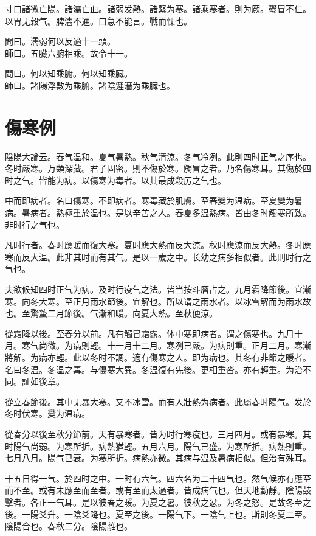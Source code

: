 寸口諸微亡陽。諸濡亡血。諸弱发熱。諸緊为寒。諸乘寒者。則为厥。鬱冒不仁。以胃无穀气。脾濇不通。口急不能言。戰而慄也。

問曰。濡弱何以反適十一頭。\\
師曰。五臓六腑相乘。故令十一。

問曰。何以知乘腑。何以知乘臓。\\
師曰。諸陽浮數为乘腑。諸陰遲濇为乘臓也。

\chapter{傷寒例}

陰陽大論云。春气温和。夏气暑熱。秋气清涼。冬气冷冽。此則四时正气之序也。冬时嚴寒。万類深藏。君子固密。則不傷於寒。觸冒之者。乃名傷寒耳。其傷於四时之气。皆能为病。以傷寒为毒者。以其最成殺厉之气也。

中而即病者。名曰傷寒。不即病者。寒毒藏於肌膚。至春變为温病。至夏變为暑病。暑病者。熱極重於温也。是以辛苦之人。春夏多温熱病。皆由冬时觸寒所致。非时行之气也。

凡时行者。春时應暖而復大寒。夏时應大熱而反大涼。秋时應涼而反大熱。冬时應寒而反大温。此非其时而有其气。是以一歲之中。长幼之病多相似者。此則时行之气也。

夫欲候知四时正气为病。及时行疫气之法。皆当按斗曆占之。九月霜降節後。宜漸寒。向冬大寒。至正月雨水節後。宜解也。所以谓之雨水者。以冰雪解而为雨水故也。至驚蟄二月節後。气漸和暖。向夏大熱。至秋便涼。

從霜降以後。至春分以前。凡有觸冒霜露。体中寒即病者。谓之傷寒也。九月十月。寒气尚微。为病則輕。十一月十二月。寒冽已嚴。为病則重。正月二月。寒漸將解。为病亦輕。此以冬时不調。適有傷寒之人。即为病也。其冬有非節之暖者。名曰冬温。冬温之毒。与傷寒大異。冬温復有先後。更相重沓。亦有輕重。为治不同。証如後章。

從立春節後。其中无暴大寒。又不冰雪。而有人壯熱为病者。此屬春时陽气。发於冬时伏寒。變为温病。

從春分以後至秋分節前。天有暴寒者。皆为时行寒疫也。三月四月。或有暴寒。其时陽气尚弱。为寒所折。病熱猶輕。五月六月。陽气已盛。为寒所折。病熱則重。七月八月。陽气已衰。为寒所折。病熱亦微。其病与温及暑病相似。但治有殊耳。

十五日得一气。於四时之中。一时有六气。四六名为二十四气也。然气候亦有應至而不至。或有未應至而至者。或有至而太過者。皆成病气也。但天地動靜。陰陽鼓擊者。各正一气耳。是以彼春之暖。为夏之暑。彼秋之忿。为冬之怒。是故冬至之後。一陽爻升。一陰爻降也。夏至之後。一陽气下。一陰气上也。斯則冬夏二至。陰陽合也。春秋二分。陰陽離也。

